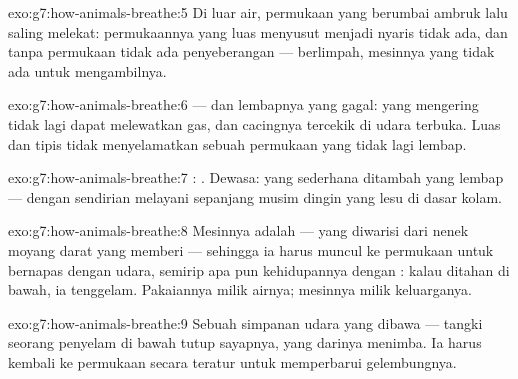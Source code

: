 \begin{solution}{exo:g7:how-animals-breathe:5}
Di luar air, permukaan  yang berumbai ambruk lalu saling
melekat: permukaannya yang luas menyusut menjadi nyaris tidak ada, dan
tanpa permukaan tidak ada penyeberangan ---  berlimpah,
mesinnya yang tidak ada untuk mengambilnya.
\end{solution}

\begin{solution}{exo:g7:how-animals-breathe:6}
 --- dan  lembapnya yang gagal:  yang
mengering tidak lagi dapat melewatkan gas, dan cacingnya tercekik di
udara terbuka. Luas dan tipis tidak menyelamatkan sebuah permukaan
yang tidak lagi lembap.
\end{solution}

\begin{solution}{exo:g7:how-animals-breathe:7}
: . Dewasa:  yang sederhana ditambah  yang
lembap --- dengan  sendirian melayani sepanjang musim dingin
yang lesu di dasar kolam.
\end{solution}

\begin{solution}{exo:g7:how-animals-breathe:8}
Mesinnya adalah  --- yang diwarisi dari nenek moyang darat
yang memberi  --- sehingga ia harus muncul ke permukaan untuk
bernapas dengan udara, semirip apa pun kehidupannya dengan : kalau
ditahan di bawah, ia tenggelam. Pakaiannya milik airnya; mesinnya
milik keluarganya.
\end{solution}

\begin{solution}{exo:g7:how-animals-breathe:9}
Sebuah simpanan udara yang dibawa --- tangki seorang penyelam di bawah
tutup sayapnya, yang darinya  menimba. Ia harus kembali ke
permukaan secara teratur untuk memperbarui gelembungnya.
\end{solution}

